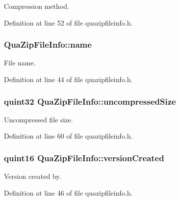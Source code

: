 Compression method. 



Definition at line 52 of file quazipfileinfo.\-h.

\hypertarget{struct_qua_zip_file_info_a16ac323965deccf0232bfae69d933a84}{
\subsubsection[{name}]{ Qua\-Zip\-File\-Info\-::name}}\label{struct_qua_zip_file_info_a16ac323965deccf0232bfae69d933a84}


File name. 



Definition at line 44 of file quazipfileinfo.\-h.

\hypertarget{struct_qua_zip_file_info_a0eb908e1b1ea637d1f1f4d6aa31db07f}{
\subsubsection[{uncompressed\-Size}]{\setlength{\rightskip}{0pt plus 5cm}quint32 Qua\-Zip\-File\-Info\-::uncompressed\-Size}}\label{struct_qua_zip_file_info_a0eb908e1b1ea637d1f1f4d6aa31db07f}


Uncompressed file size. 



Definition at line 60 of file quazipfileinfo.\-h.

\hypertarget{struct_qua_zip_file_info_a52f3f1d960ebaa2acbc2a86458fa3e6e}{
\subsubsection[{version\-Created}]{\setlength{\rightskip}{0pt plus 5cm}quint16 Qua\-Zip\-File\-Info\-::version\-Created}}\label{struct_qua_zip_file_info_a52f3f1d960ebaa2acbc2a86458fa3e6e}


Version created by. 



Definition at line 46 of file quazipfileinfo.\-h.

